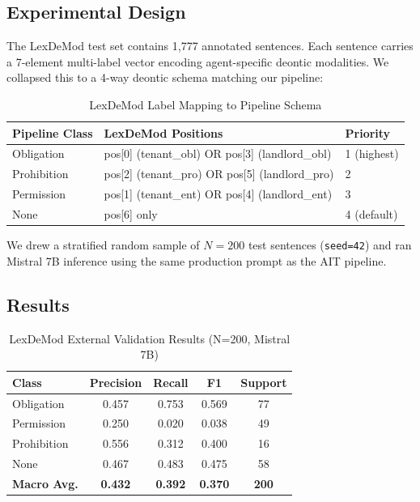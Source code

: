 \subsection{Experimental Design}

The LexDeMod test set contains 1,777 annotated sentences. Each sentence carries a 7-element multi-label vector encoding agent-specific deontic modalities. We collapsed this to a 4-way deontic schema matching our pipeline:

\begin{table}[htbp]
\centering
\caption{LexDeMod Label Mapping to Pipeline Schema}
\label{tab:lexdemod-mapping}
\begin{tabular}{lll}
\toprule
\textbf{Pipeline Class} & \textbf{LexDeMod Positions} & \textbf{Priority} \\
\midrule
Obligation  & pos[0] (tenant\_obl) OR pos[3] (landlord\_obl) & 1 (highest) \\
Prohibition & pos[2] (tenant\_pro) OR pos[5] (landlord\_pro) & 2 \\
Permission  & pos[1] (tenant\_ent) OR pos[4] (landlord\_ent) & 3 \\
None        & pos[6] only                                     & 4 (default) \\
\bottomrule
\end{tabular}
\end{table}

We drew a stratified random sample of $N = 200$ test sentences (\texttt{seed=42}) and ran Mistral 7B inference using the same production prompt as the AIT pipeline.

\subsection{Results}

\begin{table}[htbp]
\centering
\caption{LexDeMod External Validation Results (N=200, Mistral 7B)}
\label{tab:lexdemod-results}
\begin{tabular}{lcccc}
\toprule
\textbf{Class} & \textbf{Precision} & \textbf{Recall} & \textbf{F1} & \textbf{Support} \\
\midrule
Obligation  & 0.457 & 0.753 & 0.569 & 77 \\
Permission  & 0.250 & 0.020 & 0.038 & 49 \\
Prohibition & 0.556 & 0.312 & 0.400 & 16 \\
None        & 0.467 & 0.483 & 0.475 & 58 \\
\midrule
\textbf{Macro Avg.} & \textbf{0.432} & \textbf{0.392} & \textbf{0.370} & \textbf{200} \\
\bottomrule
\end{tabular}
\end{table}


